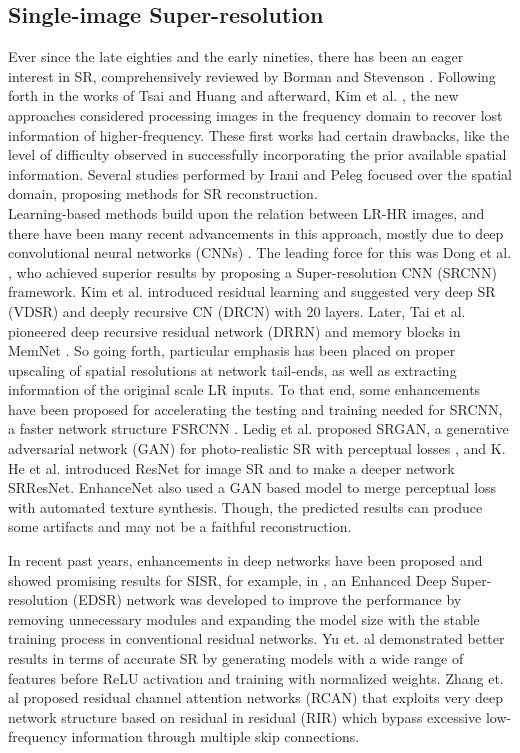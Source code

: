 \documentclass[journal]{IEEEtran}
\begin{document}
\subsection{Single-image Super-resolution}
Ever since the late eighties and the early nineties, there has been an eager interest in SR, comprehensively reviewed by Borman and Stevenson \cite{borman1998super}. Following forth in the works of Tsai and Huang \cite{tsai1984multiframe} and afterward, Kim et al. \cite{kim1990recursive}, the new approaches considered processing images in the frequency domain to recover lost information of higher-frequency. These first works had certain drawbacks, like the level of difficulty observed in successfully incorporating the prior available spatial information. Several studies performed by Irani and Peleg \cite{irani1990super,irani1991improving,irani1993motion} focused over the spatial domain, proposing methods for SR reconstruction.\\
Learning-based methods build upon the relation between LR-HR images, and there have been many recent advancements in this approach, mostly due to deep convolutional neural networks (CNNs) \cite{dong2016accelerating,kim2016accurate,dong2015image}. The leading force for this was Dong et al. \cite{dong2014learning}, who achieved superior results by proposing a Super-resolution CNN (SRCNN) framework. Kim et al. introduced residual learning and suggested very deep SR (VDSR) \cite{kim2016accurate} and deeply recursive CN (DRCN) \cite{kim2016deeply} with 20 layers. Later, Tai et al. pioneered deep recursive residual network (DRRN) \cite{tai2017image} and memory blocks in MemNet \cite{tai2017memnet}. So going forth, particular emphasis has been placed on proper upscaling of spatial resolutions at network tail-ends, as well as extracting information of the original scale LR inputs. To that end, some enhancements have been proposed for accelerating the testing and training needed for SRCNN, a faster network structure FSRCNN \cite{dong2016accelerating}. Ledig et al. \cite{ledig2017photo} proposed SRGAN, a generative adversarial network (GAN) for photo-realistic SR with perceptual losses \cite{johnson2016perceptual}, and  K. He et al. introduced ResNet \cite{he2016deep} for image SR and to make a deeper network SRResNet. EnhanceNet \cite{sajjadi2017enhancenet} also used a GAN based model to merge perceptual loss with automated texture synthesis.  Though, the predicted results can produce some artifacts and may not be a faithful reconstruction. 

In recent past years, enhancements in deep networks have been proposed and showed promising results for SISR, for example, in \cite{lim2017enhanced}, an Enhanced Deep Super-resolution (EDSR) network was developed to improve the performance by removing unnecessary modules and expanding the model size with the stable training process in conventional residual networks. Yu et. al \cite{yu2018wide} demonstrated better results in terms of accurate SR by generating models with a wide range of features before ReLU activation and training with normalized weights. Zhang et. al \cite{zhang2018image} proposed residual channel attention networks (RCAN) that exploits very deep network structure based on residual in residual (RIR) which bypass excessive low-frequency information through multiple skip connections. 
\end{document}
